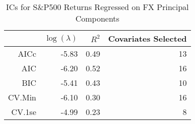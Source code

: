 \begin{table}[ht]
\centering
\begin{tabular}{rrrr}
  \hline
 & $\log(\lambda)$ & $R^2$ & Covariates Selected \\ 
  \hline
AICc & -5.83 & 0.49 &  13 \\ 
  AIC & -6.20 & 0.52 &  16 \\ 
  BIC & -5.41 & 0.43 &  10 \\ 
  CV.Min & -6.10 & 0.30 &  16 \\ 
  CV.1se & -4.99 & 0.23 &   8 \\ 
   \hline
\end{tabular}
\caption{ICs for S\&P500 Returns Regressed on FX Principal Components} 
\label{tab:spreg_ics}
\end{table}
